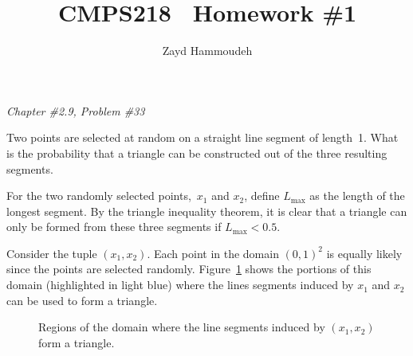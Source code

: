 \documentclass{report}
\title{\textbf{CMPS218 \textendash\ Homework \#1}}
\author{Zayd Hammoudeh}
\newcounter{subProbCount}       %
\newenvironment{problemshell}{
  \par%
  \medskip
  \leftskip=0pt\rightskip=0pt%
}
{
  \par\medskip
  \setcounter{subProbCount}{1} %
}
\newenvironment{problem}[3]
{%
  \begin{problemshell}
    \noindent \textit{Chapter \##1.#2, Problem \##3} \\
    \bfseries
}
{
  \end{problemshell}
}
\begin{document}
  \maketitle
  
  \begin{problem}{2}{9}{33}
    Two points are selected at random on a straight line segment of length~1.  What is the probability that a triangle can be constructed out of the three resulting segments.
  \end{problem}
  
  For the two randomly selected points,~$x_1$ and $x_2$, define $L_{\max}$ as the length of the longest segment.  By the triangle inequality theorem, it is clear that a triangle can only be formed from these three segments if ${L_{\max} < 0.5}$.  
  
  
  Consider the tuple ${(x_1,x_2)}$. Each point in the domain $(0,1)^2$ is equally likely since the points are selected randomly.  Figure~\ref{fig:problem2.9.33} shows the portions of this domain (highlighted in light blue) where the lines segments induced by $x_1$ and $x_2$ can be used to form a triangle.
  
  \begin{figure}[h]
    \centering
    \caption{Regions of the domain where the line segments induced by $(x_1,x_2)$ form a triangle.}\label{fig:problem2.9.33}
  \end{figure}
\end{document}
